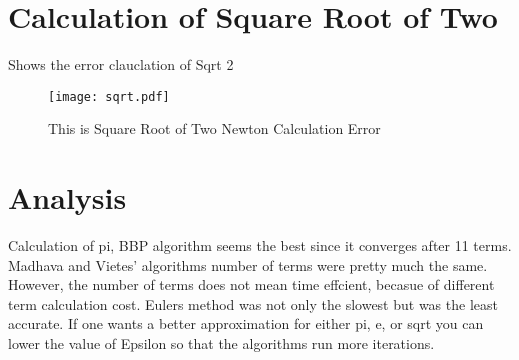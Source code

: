 \documentclass[11pt]{article} %
\begin{document}
\section{Calculation of Square Root of Two}
Shows the error clauclation of Sqrt 2
\begin{figure}[H]
\begin{center}
\texttt{[image: sqrt.pdf]}
\caption{This is Square Root of Two Newton Calculation Error}
\end{center}
\end{figure}

\section{Analysis}
Calculation of pi, BBP algorithm seems the best since it converges after 11 terms.
Madhava and Vietes' algorithms number of terms were pretty much the same. However, the number of terms does not mean time effcient, becasue of different term calculation cost.
Eulers method was not only the slowest but was the least accurate.
If one wants a better approximation for either pi, e, or sqrt you can lower the value of Epsilon so that the algorithms run more iterations.
\end{document}
